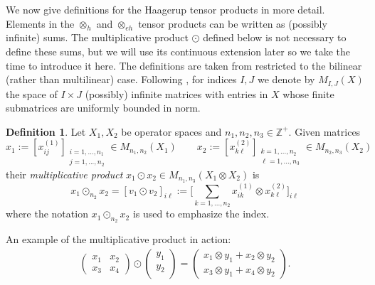 \documentclass[12pt]{article}
\theoremstyle{definition}
\newtheorem{definition}[theorem]{Definition}
\newenvironment{example}
  {\pushQED{\qed}\renewcommand{\qedsymbol}{\textcircled{\tiny E}}\examplex}
  {\popQED\endexamplex}
\newcommand{\Z}{\mathbb Z}
\newcommand{\<}{\langle}
\renewcommand{\>}{\rangle}
\newcommand{\eh}{\otimes_{eh}}
\begin{document}
We now give definitions for the Haagerup tensor products in more detail. Elements in the $\otimes_h$ and $\eh$ tensor products can be written as (possibly infinite) sums. The multiplicative product $\odot$ defined below is not necessary to define these sums, but we will use its continuous extension later so we take the time to introduce it here. The definitions are taken from \cite{opsp-hopf} restricted to the bilinear (rather than multilinear) case. Following \cite[Section 3]{opsp-hopf}, for indices $I,J$ we denote by $M_{I,J}(X)$ the space of $I\times J$ (possibly) infinite matrices with entries in $X$ whose finite submatrices are uniformly bounded in norm.

\begin{definition}  \label{defn: mult-prod-fin}
    Let $X_1, X_2$ be operator spaces and $n_1, n_2, n_3 \in \Z^+$. Given matrices
    \[
    x_1 := [x^{(1)}_{ij}]_{\substack{{i = 1,...,n_1 }\\ {j = 1,...,n_2}}} \in M_{n_1, n_2}(X_1) \qquad x_2 := [x^{(2)}_{k\ell}]_{\substack{{k = 1,...,n_2 }\\ {\ell = 1,...,n_3}}} \in M_{n_2, n_3}(X_2)
    \]
    their \textit{multiplicative product} $x_1 \odot x_2 \in M_{n_1, n_3}(X_1 \otimes X_2)$ is
    \[
    x_1 \odot_{n_2} x_2= [v_1 \odot v_2]_{i\ell} := \bigg[\sum_{k = 1,...,n_2} x_{ik}^{(1)} \otimes x_{k\ell}^{(2)}\bigg]_{i\ell}
    \]
    where the notation $x_1 \odot_{n_2} x_2$ is used to emphasize the index.
\end{definition}

\begin{example}
An example of the multiplicative product in action:
    \begin{align*}
        \begin{pmatrix}
            x_1 & x_2 \\
            x_3 & x_4 
        \end{pmatrix} \odot 
        \begin{pmatrix}
            y_1 \\
            y_2 \\
        \end{pmatrix} = 
        \begin{pmatrix}
            x_1 \otimes y_1 + x_2 \otimes y_2 \\
            x_3 \otimes y_1 + x_4 \otimes y_2
        \end{pmatrix}.
    \end{align*}
\end{example}
\end{document}
